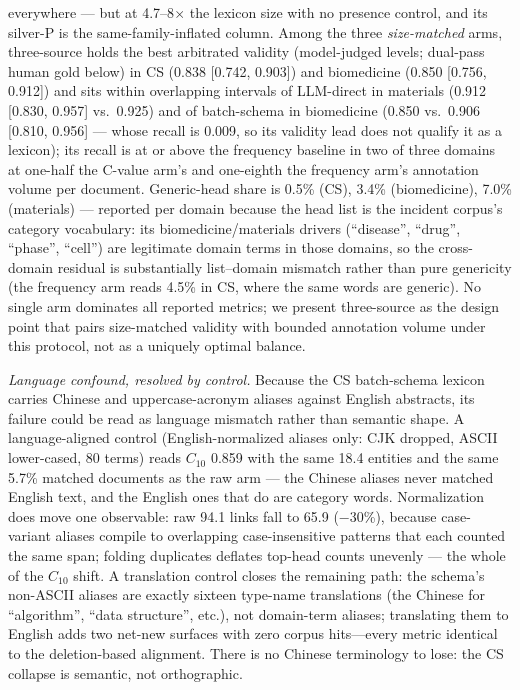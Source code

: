 \documentclass[sigconf,nonacm,anonymous]{acmart}
\begin{document}
everywhere --- but at 4.7--8$\times$ the lexicon size with no presence
control, and its silver-P is the same-family-inflated column. Among the
three \emph{size-matched} arms, three-source holds the best arbitrated
validity (model-judged levels; dual-pass human gold below) in CS
(0.838 [0.742, 0.903]) and biomedicine (0.850 [0.756,
0.912]) and sits within overlapping intervals of LLM-direct in
materials (0.912 [0.830, 0.957] vs.\ 0.925) and of batch-schema in
biomedicine (0.850 vs.\ 0.906 [0.810, 0.956] --- whose recall is
0.009, so its validity lead does not qualify it as a lexicon); its
recall is at or above the frequency baseline in two of three domains at
one-half the C-value arm's and one-eighth the frequency arm's
annotation volume per document. Generic-head share is 0.5\% (CS), 3.4\%
(biomedicine), 7.0\% (materials) --- reported per domain because the
head list is the incident corpus's category vocabulary: its
biomedicine/materials drivers (``disease'', ``drug'', ``phase'',
``cell'') are legitimate domain terms in those domains, so the
cross-domain residual is substantially list--domain mismatch rather
than pure genericity (the frequency arm reads 4.5\% in CS, where the
same words are generic). No single arm dominates all reported metrics;
we present three-source as the design point that pairs size-matched
validity with bounded annotation volume under this protocol, not as a
uniquely optimal balance.

\emph{Language confound, resolved by control.} Because the CS
batch-schema lexicon carries Chinese and uppercase-acronym aliases
against English abstracts, its failure could be read as language
mismatch rather than semantic shape. A language-aligned control
(English-normalized aliases only: CJK dropped, ASCII lower-cased, 80
terms) reads $C_{10}$ 0.859 with the same 18.4 entities and the same
5.7\% matched documents as the raw arm --- the Chinese aliases never
matched English text, and the English ones that do are category
words. Normalization does move one observable: raw 94.1 links fall to
65.9 ($-$30\%), because case-variant aliases compile to overlapping
case-insensitive patterns that each counted the same span; folding
duplicates deflates top-head counts unevenly --- the whole of the
$C_{10}$ shift. A translation control closes the remaining path: the
schema's non-ASCII aliases are exactly sixteen type-name translations
(the Chinese for ``algorithm'', ``data structure'', etc.), not
domain-term aliases; translating them to English adds two net-new
surfaces with zero corpus hits---every metric identical to the
deletion-based alignment. There is no Chinese terminology to lose:
the CS collapse is semantic, not orthographic.
\end{document}
